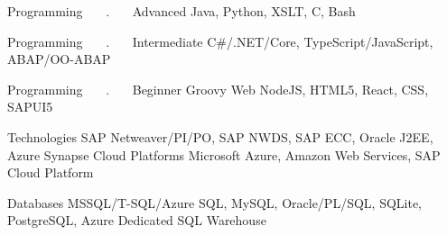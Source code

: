 

\begin{cvskills}

  \cvskill
    {Programming ~~~.~~~ Advanced} %
    {Java, Python, XSLT, C, Bash} %


\cvskill
    {Programming ~~~.~~~ Intermediate} %
    {C\#/.NET/Core, TypeScript/JavaScript, ABAP/OO-ABAP}

\cvskill
    {Programming ~~~.~~~ Beginner} %
    {Groovy}
  \cvskill
    {Web} %
    {NodeJS, HTML5, React, CSS, SAPUI5} %

  \cvskill
    {Technologies} %
    {SAP Netweaver/PI/PO, SAP NWDS, SAP ECC, Oracle J2EE, Azure Synapse} %
  \cvskill
    {Cloud Platforms} %
    {Microsoft Azure, Amazon Web Services, SAP Cloud Platform} %

  \cvskill
    {Databases} %
    {MSSQL/T-SQL/Azure SQL, MySQL, Oracle/PL/SQL, SQLite, PostgreSQL, Azure Dedicated SQL Warehouse} %


\end{cvskills}
